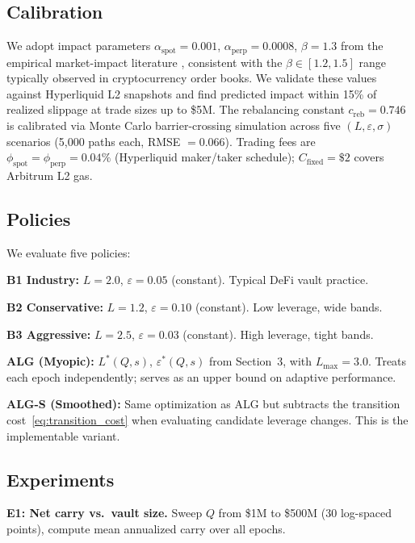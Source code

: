 \documentclass[11pt]{article}
\begin{document}
\subsection{Calibration}

We adopt impact parameters $\alpha_{\text{spot}} = 0.001$, $\alpha_{\text{perp}} = 0.0008$, $\beta = 1.3$ from the empirical market-impact literature \citep{gatheral2010, almgren2005direct}, consistent with the $\beta \in [1.2, 1.5]$ range typically observed in cryptocurrency order books. We validate these values against Hyperliquid L2 snapshots and find predicted impact within 15\% of realized slippage at trade sizes up to \$5M. The rebalancing constant $c_{\text{reb}} = 0.746$ is calibrated via Monte Carlo barrier-crossing simulation across five $(L, \varepsilon, \sigma)$ scenarios (5{,}000 paths each, RMSE $= 0.066$). Trading fees are $\phi_{\text{spot}} = \phi_{\text{perp}} = 0.04\%$ (Hyperliquid maker/taker schedule); $C_{\text{fixed}} = \$2$ covers Arbitrum L2 gas.

\subsection{Policies}

We evaluate five policies:

\textbf{B1 Industry:} $L = 2.0$, $\varepsilon = 0.05$ (constant). Typical DeFi vault practice.

\textbf{B2 Conservative:} $L = 1.2$, $\varepsilon = 0.10$ (constant). Low leverage, wide bands.

\textbf{B3 Aggressive:} $L = 2.5$, $\varepsilon = 0.03$ (constant). High leverage, tight bands.

\textbf{ALG (Myopic):} $L^*(Q, s)$, $\varepsilon^*(Q, s)$ from Section~3, with $L_{\max} = 3.0$. Treats each epoch independently; serves as an upper bound on adaptive performance.

\textbf{ALG-S (Smoothed):} Same optimization as ALG but subtracts the transition cost~\eqref{eq:transition_cost} when evaluating candidate leverage changes. This is the implementable variant.

\subsection{Experiments}

\textbf{E1: Net carry vs.\ vault size.} Sweep $Q$ from \$1M to \$500M (30 log-spaced points), compute mean annualized carry over all epochs.
\end{document}
